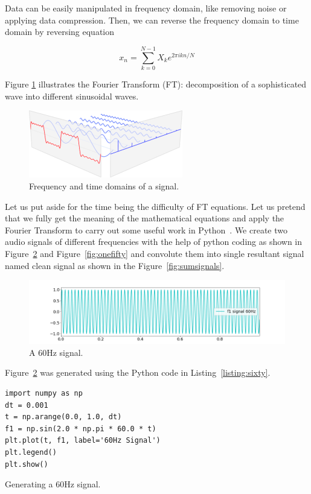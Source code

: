\documentclass[a4paper, 12pt]{scrartcl}
\begin{document}
Data can be easily manipulated in frequency domain, like removing noise or applying data compression.
Then, we can reverse the frequency domain to time domain by reversing equation

\begin{equation}
  x_n = \sum_{k=0}^{N-1} X_k e^{2 \pi i k n / N}
\end{equation}

Figure \ref{fig:fourier} illustrates the Fourier Transform (FT): decomposition of a sophisticated wave into different sinusoidal waves.

\begin{figure}[H] 
  \centering
  \includegraphics[width=0.6\textwidth]{img/fourier-dimensions.png}
  \caption{Frequency and time domains of a signal.}
  \label{fig:fourier}
\end{figure}

Let us put aside for the time being the difficulty of FT equations.
Let us pretend that we fully get the meaning of the mathematical equations and apply the Fourier Transform to carry out some useful work in Python~\cite{CleanUpNoise}.
We create two audio signals of different frequencies with the help of python coding as shown in Figure~\ref{fig:sixty} and Figure~\ref{fig:onefifty} and convolute them into single resultant signal named clean signal as shown in the Figure~\ref{fig:sumsignals}. 

\begin{figure}[H] 
  \centering
  \includegraphics[width=\textwidth]{img/signal_60hz.png}
  \caption{A 60Hz signal.}
  \label{fig:sixty}
\end{figure}

Figure~\ref{fig:sixty} was generated using the Python code in Listing~\ref{listing:sixty}.

\begin{listing}[h]
\begin{verbatim}
import numpy as np
dt = 0.001
t = np.arange(0.0, 1.0, dt)
f1 = np.sin(2.0 * np.pi * 60.0 * t)
plt.plot(t, f1, label='60Hz Signal')
plt.legend()
plt.show()
\end{verbatim}
\caption{Generating a 60Hz signal.}
\label{listing:sixty}
\end{listing}
\end{document}
